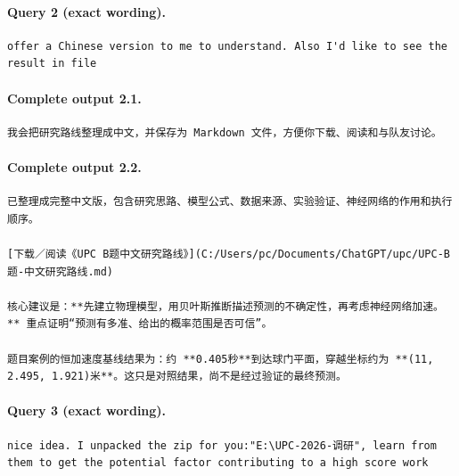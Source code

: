 \documentclass[UTF8,10pt]{ctexart}
\begin{document}
\paragraph{Query 2 (exact wording).}
\begin{Verbatim}[breaklines=true,breakanywhere=true,fontsize=\scriptsize,frame=single,framesep=2pt]
offer a Chinese version to me to understand. Also I'd like to see the result in file
\end{Verbatim}

\paragraph{Complete output 2.1.}
\begin{Verbatim}[breaklines=true,breakanywhere=true,fontsize=\scriptsize,frame=single,framesep=2pt]
我会把研究路线整理成中文，并保存为 Markdown 文件，方便你下载、阅读和与队友讨论。
\end{Verbatim}

\paragraph{Complete output 2.2.}
\begin{Verbatim}[breaklines=true,breakanywhere=true,fontsize=\scriptsize,frame=single,framesep=2pt]
已整理成完整中文版，包含研究思路、模型公式、数据来源、实验验证、神经网络的作用和执行顺序。

[下载／阅读《UPC B题中文研究路线》](C:/Users/pc/Documents/ChatGPT/upc/UPC-B题-中文研究路线.md)

核心建议是：**先建立物理模型，用贝叶斯推断描述预测的不确定性，再考虑神经网络加速。** 重点证明“预测有多准、给出的概率范围是否可信”。

题目案例的恒加速度基线结果为：约 **0.405秒**到达球门平面，穿越坐标约为 **(11, 2.495, 1.921)米**。这只是对照结果，尚不是经过验证的最终预测。
\end{Verbatim}

\paragraph{Query 3 (exact wording).}
\begin{Verbatim}[breaklines=true,breakanywhere=true,fontsize=\scriptsize,frame=single,framesep=2pt]
nice idea. I unpacked the zip for you:"E:\UPC-2026-调研", learn from them to get the potential factor contributing to a high score work
\end{Verbatim}
\end{document}
